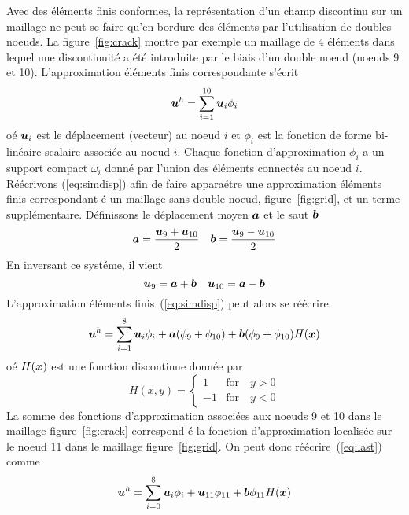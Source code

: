 Avec des \'el\'ements finis conformes,
la repr\'esentation d'un champ discontinu sur un maillage
ne peut se faire qu'en bordure des \'el\'ements par l'utilisation
de doubles noeuds. La figure~\ref{fig:crack} montre par exemple
un maillage de 4 \'el\'ements dans lequel une discontinuit\'e
a \'et\'e introduite par le biais d'un double noeud (noeuds 9 et 10).
L'approximation \'el\'ements finis correspondante s'\'ecrit
\begin{equation}
\mbox{\boldmath $u$}^h = \sum_{i=1}^{10} \mbox{\boldmath $u$}_i \phi_i
\label{eq:simdisp}
\end{equation}
o\'e $\mbox{\boldmath $u$}_i$ est le d\'eplacement (vecteur) au noeud  $i$ et $\phi_i$
est la fonction de forme bi-lin\'eaire scalaire associ\'ee au noeud $i$.
Chaque fonction d'approximation $\phi_i$ a un support  compact
$\omega_i$ donn\'e par l'union des \'el\'ements connect\'es au noeud $i$.
R\'e\'ecrivons (\ref{eq:simdisp}) afin de faire appara\'etre une
approximation \'el\'ements finis correspondant \'e un maillage sans double
noeud, figure~\ref{fig:grid}, et un terme suppl\'ementaire.
D\'efinissons le d\'eplacement moyen $\mbox{\boldmath $a$}$ et le saut $\mbox{\boldmath $b$}$
\begin{equation}
\mbox{\boldmath $a$} = \frac{\mbox{\boldmath $u$}_{9} + \mbox{\boldmath $u$}_{10}}{2} \quad
\mbox{\boldmath $b$} = \frac{\mbox{\boldmath $u$}_{9} - \mbox{\boldmath $u$}_{10}}{2}
\label{eq:cfem}
\end{equation}
En inversant ce syst\'eme, il vient
\begin{equation}
\mbox{\boldmath $u$}_{9} = \mbox{\boldmath $a$} + \mbox{\boldmath $b$} \quad \mbox{\boldmath $u$}_{10} = \mbox{\boldmath $a$} - \mbox{\boldmath $b$}
\end{equation}
L'approximation \'el\'ements finis~(\ref{eq:simdisp}) peut alors
se r\'e\'ecrire
\begin{equation}
\mbox{\boldmath $u$}^h = \sum_{i=1}^{8} \mbox{\boldmath $u$}_i \phi_i + \mbox{\boldmath $a$} (\phi_{9} + \phi_{10}) +
\mbox{\boldmath $b$} (\phi_{9} + \phi_{10}) H(\mbox{\boldmath $x$})
\label{eq:last}
\end{equation}
o\'e $H(\mbox{\boldmath $x$})$ est une fonction discontinue donn\'ee par
\begin{equation}
H(x,y) = \begin{cases}
1 & \mbox{for}\quad y > 0 \\
-1 & \mbox{for}\quad  y<0
\end{cases}
\label{hdef}
\end{equation}
La somme des fonctions d'approximation associ\'ees aux noeuds 9 et 10
dans le maillage figure~\ref{fig:crack} correspond \'e la fonction
d'approximation localis\'ee sur le noeud 11 dans le maillage figure~\ref{fig:grid}.
On peut donc r\'e\'ecrire~(\ref{eq:last}) comme
\begin{equation}
\mbox{\boldmath $u$}^h = \sum_{i=0}^{8} \mbox{\boldmath $u$}_i \phi_i + \mbox{\boldmath $u$}_{11} \phi_{11}
+ \mbox{\boldmath $b$} \phi_{11} H(\mbox{\boldmath $x$})
\label{eq:last2}
\end{equation}
